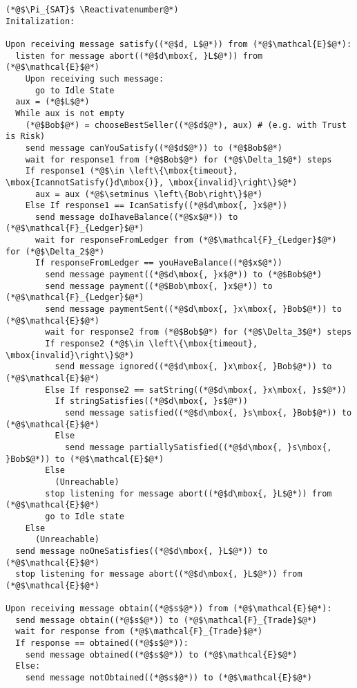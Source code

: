 \Suppressnumber
\begin{lstlisting}[label=satprot, style=numbers]
(*@$\Pi_{SAT}$ \Reactivatenumber@*)
Initalization:

Upon receiving message satisfy((*@$d, L$@*)) from (*@$\mathcal{E}$@*):
  listen for message abort((*@$d\mbox{, }L$@*)) from (*@$\mathcal{E}$@*)
    Upon receiving such message:
      go to Idle State
  aux = (*@$L$@*)
  While aux is not empty
    (*@$Bob$@*) = chooseBestSeller((*@$d$@*), aux) # (e.g. with Trust is Risk)
    send message canYouSatisfy((*@$d$@*)) to (*@$Bob$@*)
    wait for response1 from (*@$Bob$@*) for (*@$\Delta_1$@*) steps
    If response1 (*@$\in \left\{\mbox{timeout}, \mbox{IcannotSatisfy(}d\mbox{)}, \mbox{invalid}\right\}$@*)
      aux = aux (*@$\setminus \left\{Bob\right\}$@*)
    Else If response1 == IcanSatisfy((*@$d\mbox{, }x$@*))
      send message doIhaveBalance((*@$x$@*)) to (*@$\mathcal{F}_{Ledger}$@*)
      wait for responseFromLedger from (*@$\mathcal{F}_{Ledger}$@*) for (*@$\Delta_2$@*)
      If responseFromLedger == youHaveBalance((*@$x$@*))
        send message payment((*@$d\mbox{, }x$@*)) to (*@$Bob$@*)
        send message payment((*@$Bob\mbox{, }x$@*)) to (*@$\mathcal{F}_{Ledger}$@*)
        send message paymentSent((*@$d\mbox{, }x\mbox{, }Bob$@*)) to (*@$\mathcal{E}$@*)
        wait for response2 from (*@$Bob$@*) for (*@$\Delta_3$@*) steps
        If response2 (*@$\in \left\{\mbox{timeout}, \mbox{invalid}\right\}$@*)
          send message ignored((*@$d\mbox{, }x\mbox{, }Bob$@*)) to (*@$\mathcal{E}$@*)
        Else If response2 == satString((*@$d\mbox{, }x\mbox{, }s$@*))
          If stringSatisfies((*@$d\mbox{, }s$@*))
            send message satisfied((*@$d\mbox{, }s\mbox{, }Bob$@*)) to (*@$\mathcal{E}$@*)
          Else
            send message partiallySatisfied((*@$d\mbox{, }s\mbox{, }Bob$@*)) to (*@$\mathcal{E}$@*)
        Else
          (Unreachable)
        stop listening for message abort((*@$d\mbox{, }L$@*)) from (*@$\mathcal{E}$@*)
        go to Idle state
    Else
      (Unreachable)
  send message noOneSatisfies((*@$d\mbox{, }L$@*)) to (*@$\mathcal{E}$@*)
  stop listening for message abort((*@$d\mbox{, }L$@*)) from (*@$\mathcal{E}$@*)

Upon receiving message obtain((*@$s$@*)) from (*@$\mathcal{E}$@*):
  send message obtain((*@$s$@*)) to (*@$\mathcal{F}_{Trade}$@*)
  wait for response from (*@$\mathcal{F}_{Trade}$@*)
  If response == obtained((*@$s$@*)):
    send message obtained((*@$s$@*)) to (*@$\mathcal{E}$@*)
  Else:
    send message notObtained((*@$s$@*)) to (*@$\mathcal{E}$@*)


\end{lstlisting}

